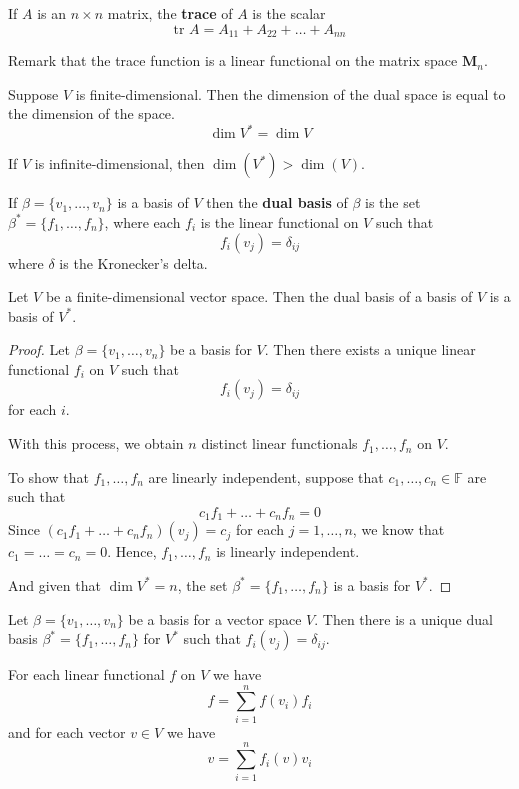 \begin{example}[Trace]
	If $A$ is an $n \times n$ matrix, the \textbf{trace} of $A$ is the scalar
	\[
		\text{tr } A = A_{11} + A_{22} + \ldots + A_{nn}
	\]
	
	Remark that the trace function is a linear functional on the matrix space $\textbf{M}_n$.
\end{example}

\begin{remark}
	Suppose $V$ is finite-dimensional. Then the dimension of the dual space is equal to the dimension of the space.
	\[
		\dim V^\ast = \dim V
	\]

	If $V$ is infinite-dimensional, then $\dim (V^\ast) > \dim (V)$.
\end{remark}

\begin{definition}
	If $\beta = \{ v_1, \ldots, v_n \}$ is a basis of $V$ then the \textbf{dual basis} of $\beta$ is the set $\beta^\ast = \{ f_1, \ldots, f_n \}$, where each $f_i$ is the linear functional on $V$ such that 
	\[
		f_i(v_j) = \delta_{ij}
	\]
	where $\delta$ is the Kronecker's delta.
\end{definition}

\begin{theorem}
	Let $V$ be a finite-dimensional vector space. Then the dual basis of a basis of $V$ is a basis of $V^\ast$.
\end{theorem}

\begin{proof}
	Let $\beta = \{ v_1, \ldots, v_n \}$ be a basis for $V$. Then there exists a unique linear functional $f_i$ on $V$ such that
	\[
		f_i(v_j) = \delta_{ij}
	\]
	for each $i$.

	With this process, we obtain $n$ distinct linear functionals $f_1, \ldots, f_n$ on $V$.

	To show that $f_1, \ldots, f_n$ are linearly independent, suppose that $c_1, \ldots, c_n \in \mathbb{F}$ are such that
	\[
		c_1 f_1 + \ldots + c_n f_n = 0
	\]
	Since $(c_1 f_1 + \ldots + c_n f_n)(v_j) = c_j$ for each $j = 1, \ldots, n$, we know that $c_1 = \ldots = c_n = 0$. Hence, $f_1, \ldots, f_n$ is linearly independent.
	
	And given that $\dim V^\ast = n$, the set $\beta^\ast = \{ f_1, \ldots, f_n \}$ is a basis for $V^\ast$.
\end{proof}

\begin{theorem}
	Let $\beta = \{ v_1, \ldots, v_n \}$ be a basis for a vector space $V$. Then there is a unique dual basis $\beta^\ast = \{ f_1, \ldots, f_n \}$ for $V^\ast$ such that $f_i (v_j) = \delta_{ij}$.
	
	For each linear functional $f$ on $V$ we have
	\[
		f = \sum_{i=1}^n f(v_i) f_i
	\]
	and for each vector $v \in V$ we have
	\[
		v = \sum_{i=1}^n f_i(v) v_i
	\]
\end{theorem}

